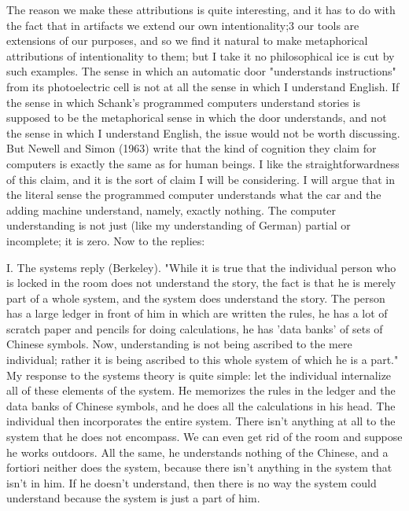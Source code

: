The reason we make these attributions is quite interesting, and it has to do with the fact that in artifacts we
extend our own intentionality;3 our tools are extensions of our purposes, and so we find it natural to make
metaphorical attributions of intentionality to them; but I take it no philosophical ice is cut by such examples. The
sense in which an automatic door "understands instructions" from its photoelectric cell is not at all the sense in
which I understand English. If the sense in which Schank's programmed computers understand stories is
supposed to be the metaphorical sense in which the door understands, and not the sense in which I understand
English, the issue would not be worth discussing. But Newell and Simon (1963) write that the kind of cognition
they claim for computers is exactly the same as for human beings. I like the straightforwardness of this claim,
and it is the sort of claim I will be considering. I will argue that in the literal sense the programmed computer
understands what the car and the adding machine understand, namely, exactly nothing. The computer
understanding is not just (like my understanding of German) partial or incomplete; it is zero.
Now to the replies:

I. The systems reply (Berkeley). "While it is true that the individual person who is locked in the room does not
understand the story, the fact is that he is merely part of a whole system, and the system does understand the
story. The person has a large ledger in front of him in which are written the rules, he has a lot of scratch paper
and pencils for doing calculations, he has 'data banks' of sets of Chinese symbols. Now, understanding is not
being ascribed to the mere individual; rather it is being ascribed to this whole system of which he is a part."
My response to the systems theory is quite simple: let the individual internalize all of these elements of the
system. He memorizes the rules in the ledger and the data banks of Chinese symbols, and he does all the
calculations in his head. The individual then incorporates the entire system. There isn't anything at all to the
system that he does not encompass. We can even get rid of the room and suppose he works outdoors. All the
same, he understands nothing of the Chinese, and a fortiori neither does the system, because there isn't anything
in the system that isn't in him. If he doesn't understand, then there is no way the system could understand
because the system is just a part of him.

